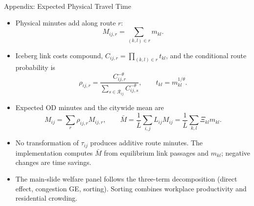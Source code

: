 \documentclass[11pt,aspectratio=169]{beamer}
\newcommand{\navback}[1]{\par\vspace{0.35em}\noindent\hfill\hyperlink{#1}{\beamerreturnbutton{back}}}
\begin{document}
\begin{frame}[label=appphysicaltime]{Appendix: Expected Physical Travel Time}
\scriptsize
\begin{itemize}\setlength\itemsep{0.45em}
  \item Physical minutes add along route $r$:
  \vspace{-0.35em}
  \[
    M_{ij,r}=\sum_{(k,l)\in r}m_{kl}.
  \]
  \vspace{-0.75em}
  \item Iceberg link costs compound, $C_{ij,r}=\prod_{(k,l)\in r}t_{kl}$, and the conditional route probability is
  \vspace{-0.35em}
  \[
    \rho_{ij,r}=\frac{C_{ij,r}^{-\theta}}{\sum_{s\in\mathcal R_{ij}}C_{ij,s}^{-\theta}},
    \qquad t_{kl}=m_{kl}^{1/\theta}.
  \]
  \vspace{-0.75em}
  \item Expected OD minutes and the citywide mean are
  \vspace{-0.35em}
  \[
    M_{ij}=\sum_r\rho_{ij,r}M_{ij,r},
    \qquad
    \bar M=\frac{1}{\bar L}\sum_{i,j}L_{ij}M_{ij}
    =\frac{1}{\bar L}\sum_{k,l}\Xi_{kl}m_{kl}.
  \]
  \vspace{-0.75em}
  \item No transformation of $\tau_{ij}$ produces additive route minutes. The implementation computes $\bar M$ from equilibrium link passages and $m_{kl}$; negative changes are time savings.
  \item The main-slide welfare panel follows the three-term decomposition (direct effect, congestion GE, sorting). Sorting combines workplace productivity and residential crowding.
\end{itemize}
\navback{result2}
\end{frame}
\end{document}
